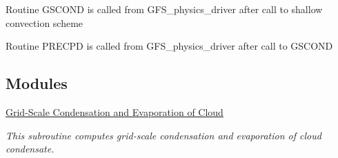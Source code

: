 \begin{DoxyItemize}
\item Routine G\+S\+C\+O\+ND is called from G\+F\+S\+\_\+physics\+\_\+driver after call to shallow convection scheme
\item Routine P\+R\+E\+C\+PD is called from G\+F\+S\+\_\+physics\+\_\+driver after call to G\+S\+C\+O\+ND 
\end{DoxyItemize}\subsection*{Modules}
\begin{DoxyCompactItemize}
\item 
\hyperlink{group__condense}{Grid-\/\+Scale Condensation and Evaporation of Cloud}
\begin{DoxyCompactList}\small\item\em This subroutine computes grid-\/scale condensation and evaporation of cloud condensate. \end{DoxyCompactList}\end{DoxyCompactItemize}
